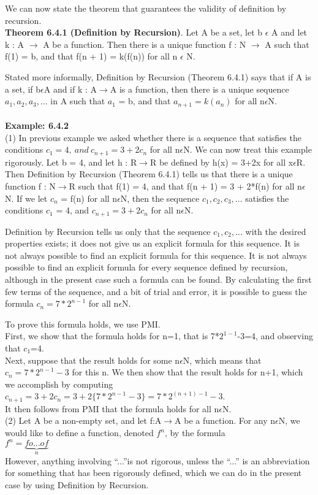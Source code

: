 \documentclass[a4paper,english,12pt]{article}
\begin{document}
    We can now state the theorem that guarantees the validity of definition by recursion. \\
{\bf Theorem 6.4.1 (Definition by Recursion)}. Let A be a set, let b $\epsilon$ A and let k : A $\rightarrow$ A be a function. Then there is a unique function f : N $\rightarrow$ A such that f(1) = b, and that f(n + 1) = k(f(n)) for all n $\epsilon$ N.

     Stated more informally, Definition by Recursion (Theorem 6.4.1) says that if A is a set, if b$\epsilon$A and if k : 
A$\rightarrow$A is a function,  then there is a unique sequence $a_1, a_2, a_3 , . . .$ in A such that $a_1$ = b, and that $a_{n+1} = k(a_n)$ for all n$\epsilon$N. \\\\
{\bf Example: 6.4.2} 
\\
(1) In previous example we asked whether there is a sequence that satisfies the conditions $c_1 = 4,~ and~ c_{n+1} = 3 + 2c_n$ for all n$\epsilon$N. We can now treat this example rigorously. Let b = 4, and let h : R$\rightarrow$R be defined by h(x) = 3+2x for all x$\epsilon$R. Then Definition by Recursion (Theorem 6.4.1) tells us that there is a unique function f : N$\rightarrow$R such that f(1) = 4, and that f(n + 1) = 3 + 2*f(n) for all n$\epsilon$N. If we let $c_n$ = f(n) for all n$\epsilon$N, then the sequence $c_1, c_2, c_3 , . . . $ satisfies the conditions $c_1$ = 4, and $c_{n+1}=3+2c_n$ for all n$\epsilon$N.


Definition by Recursion tells us only that the sequence $c_1, c_2, ...$ with the desired properties exists; it does not give us an explicit formula for this sequence. It is not always possible to find an explicit formula for this sequence. It is not always possible to find an explicit formula for every sequence defined by recursion, although in the present case such a formula can be found. By calculating the first few terms of the sequence, and a bit of trial and error, it is possible to guess the formula $c_n=7*2^{n-1}$ for all n$\epsilon$N.

To prove this formula holds, we use PMI. \\First, we show that the formula holds for n=1, that is 7*$2^{1-1}$-3=4, and observing that $c_1$=4. \\ Next, suppose that the result holds for some n$\epsilon$N, which means that $c_n=7*2^{n-1}-3$ for this n. We then show that the result holds for n+1, which we accomplish by computing\\ $c_{n+1}=3+2c_n=3+2\{7*2^{n-1}-3\}=7*2^{(n+1)-1}-3$.\\
It then follows from PMI that the formula holds for all n$\epsilon$N.\\
(2) Let A be a non-empty set, and let f:A$\rightarrow$A be a function. For any n$\epsilon$N, we would like to define a function, denoted $f^n$, by the formula\\
$f^n=\underbrace{fo...of}_n$\\
However, anything involving ``...''is not rigorous, unless the ``...'' is an abbreviation for something that has been rigorously defined, which we can do in the present case by using Definition by Recursion.
\end{document}
